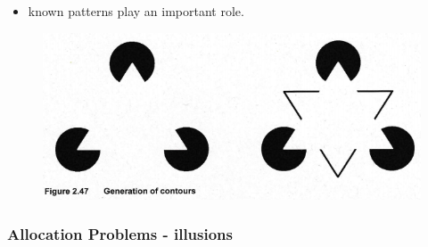 \documentclass{standalone}
\begin{document}
\begin{itemize}
\begin{itemize}
			\item known patterns play an important role.
		\end{itemize}
		\begin{figure}[H]
		\centering
		\includegraphics[width = 0.7\linewidth]{Figures/2_47.png}
		\end{figure}
\end{itemize}

\subsubsection*{Allocation Problems - illusions}
\end{document}
